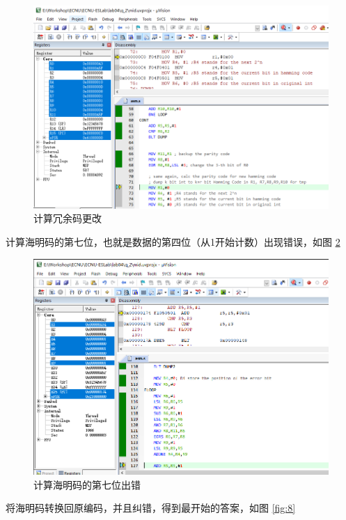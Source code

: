 \documentclass[a4paper,10pt,UTF8]{paper}
\numberwithin{equation}{section}
\numberwithin{figure}{section}
\begin{document}
\begin{figure}[h]
  \centering
  \includegraphics[width=0.9\linewidth]{2.PNG}
  \caption{计算冗余码更改}
  \label{fig:6}
\end{figure}

计算海明码的第七位，也就是数据的第四位（从1开始计数）出现错误，如图 \ref{fig:7}


\begin{figure}[h]
  \centering
  \includegraphics[width=0.9\linewidth]{3.png}
  \caption{计算海明码的第七位出错}
  \label{fig:7}
\end{figure}

将海明码转换回原编码，并且纠错，得到最开始的答案，如图 \ref{fig:8}
\end{document}
